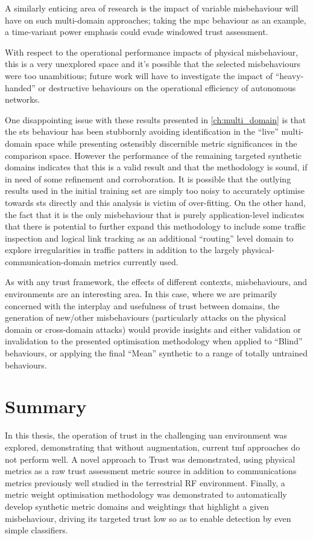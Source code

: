 A similarly enticing area of research is the impact of variable misbehaviour will have on such multi-domain approaches; taking the \gls{mpc} behaviour as an example, a time-variant power emphasis could evade windowed trust assessment.

With respect to the operational performance impacts of physical misbehaviour, this is a very unexplored space and it's possible that the selected misbehaviours were too unambitious; future work will have to investigate the impact of ``heavy-handed'' or destructive behaviours on the operational efficiency of autonomous networks.

One disappointing issue with these results presented in \autoref{ch:multi_domain} is that the \gls{sts} behaviour has been stubbornly avoiding identification in the ``live'' multi-domain space while presenting ostensibly discernible metric significances in the comparison space. 
However the performance of the remaining targeted synthetic domains indicates that this is a valid result and that the methodology is sound, if in need of some refinement and corroboration.
It is possible that the outlying results used in the initial training set are simply too noisy to accurately optimise towards \gls{sts} directly and this analysis is victim of over-fitting. 
On the other hand, the fact that it is the only misbehaviour that is purely application-level indicates that there is potential to further expand this methodology to include some traffic inspection and logical link tracking as an additional ``routing'' level domain to explore irregularities in traffic patters in addition to the largely physical-communication-domain metrics currently used.

As with any trust framework, the effects of different contexts, misbehaviours, and environments are an interesting area.
In this case, where we are primarily concerned with the interplay and usefulness of trust between domains, the generation of new/other misbehaviours (particularly attacks on the physical domain or cross-domain attacks) would provide insights and either validation or invalidation to the presented optimisation methodology when applied to ``Blind'' behaviours, or applying the final ``Mean'' synthetic to a range of totally untrained behaviours.

\section{Summary}

In this thesis, the operation of trust in the challenging \gls{uan} environment was explored, demonstrating that without augmentation, current \gls{tmf} approaches do not perform well.
A novel approach to Trust was demonstrated, using physical metrics as a raw trust assessment metric source in addition to communications metrics previously well studied in the terrestrial RF environment.
Finally, a metric weight optimisation methodology was demonstrated to automatically develop synthetic metric domains and weightings that highlight a given misbehaviour, driving its targeted trust low so as to enable detection by even simple classifiers.

